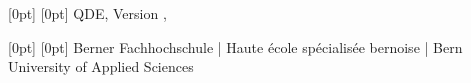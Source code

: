 \documentclass[
    a4paper,      %
    10pt,         %
    openright,    %
    notitlepage,  %
    parskip=half, %
]{scrreprt}       %
\theoremstyle{definition}                    %
\begin{document}

\providecommand{\titel}{QDE}

  [0pt] %
  [0pt] %
  {} %
  {} %
  {} %
  {\color{bfhgrey} \footnotesize \titel, Version \vhCurrentVersion,
      \vhCurrentDate} %
  {} %
  {\color{bfhgrey} \thepage} %

  [0pt] %
  [0pt] %
  {} %
  {} %
  {} %
  {\color{bfhgrey}\fontsize{9pt}{10pt}\selectfont
    Berner Fachhochschule | Haute école spécialisée bernoise | Bern
    University of Applied Sciences} %
  {} %
  {} %


\pagestyle{newlayout}
\renewcommand{\chapterpagestyle}{newlayout}
\renewcommand{\chaptermark}[1]{\markboth{\thechapter.  #1}{}}
\renewcommand*{\headfont}{\normalfont}
\renewcommand*{\footfont}{\normalfont}

\setcounter{page}{1}


\listoftodos{}


\tableofcontents
\cleardoublepage{}








\end{document}
